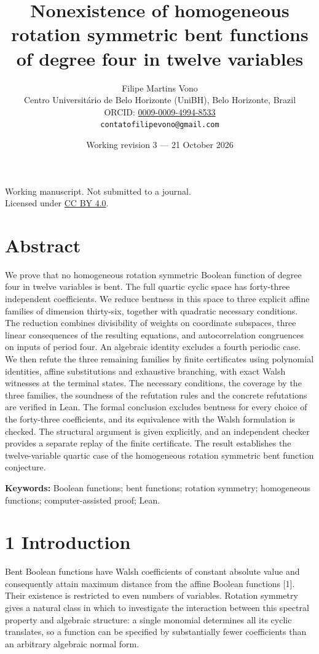 \documentclass[11pt,a4paper]{article}
\title{Nonexistence of homogeneous rotation symmetric bent functions of degree four in twelve variables}
\author{Filipe Martins Vono\\\small Centro Universit\'ario de Belo Horizonte (UniBH), Belo Horizonte, Brazil\\\small ORCID: \href{https://orcid.org/0009-0009-4994-8533}{0009-0009-4994-8533}\\\small\texttt{contatofilipevono@gmail.com}}
\date{Working revision 3 --- 21 October 2026}
\begin{document}
\maketitle
\begin{center}\small Working manuscript. Not submitted to a journal.\\Licensed under \href{https://creativecommons.org/licenses/by/4.0/}{CC BY 4.0}.\end{center}
\section*{Abstract}
We prove that no homogeneous rotation symmetric Boolean function of degree four in twelve variables is bent. The full quartic cyclic space has forty-three independent coefficients. We reduce bentness in this space to three explicit affine families of dimension thirty-six, together with quadratic necessary conditions. The reduction combines divisibility of weights on coordinate subspaces, three linear consequences of the resulting equations, and autocorrelation congruences on inputs of period four. An algebraic identity excludes a fourth periodic case. We then refute the three remaining families by finite certificates using polynomial identities, affine substitutions and exhaustive branching, with exact Walsh witnesses at the terminal states. The necessary conditions, the coverage by the three families, the soundness of the refutation rules and the concrete refutations are verified in Lean. The formal conclusion excludes bentness for every choice of the forty-three coefficients, and its equivalence with the Walsh formulation is checked. The structural argument is given explicitly, and an independent checker provides a separate replay of the finite certificate. The result establishes the twelve-variable quartic case of the homogeneous rotation symmetric bent function conjecture.

\textbf{Keywords:} Boolean functions; bent functions; rotation symmetry; homogeneous functions; computer-assisted proof; Lean.
\section*{1 Introduction}

Bent Boolean functions have Walsh coefficients of constant absolute value and consequently attain maximum distance from the affine Boolean functions [1]. Their existence is restricted to even numbers of variables. Rotation symmetry gives a natural class in which to investigate the interaction between this spectral property and algebraic structure: a single monomial determines all its cyclic translates, so a function can be specified by substantially fewer coefficients than an arbitrary algebraic normal form.
\end{document}
